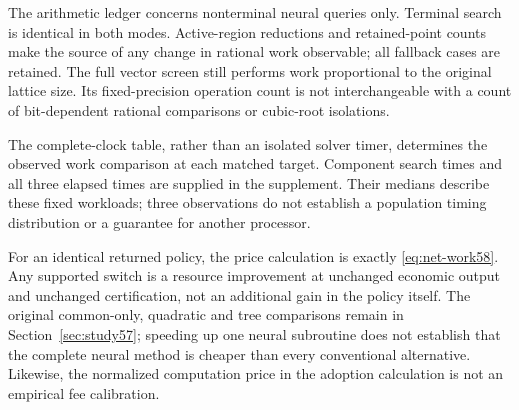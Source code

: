 



The arithmetic ledger concerns nonterminal neural queries only. Terminal search is identical in both modes. Active-region reductions and retained-point counts make the source of any change in rational work observable; all fallback cases are retained. The full vector screen still performs work proportional to the original lattice size. Its fixed-precision operation count is not interchangeable with a count of bit-dependent rational comparisons or cubic-root isolations.

The complete-clock table, rather than an isolated solver timer, determines the observed work comparison at each matched target. Component search times and all three elapsed times are supplied in the supplement. Their medians describe these fixed workloads; three observations do not establish a population timing distribution or a guarantee for another processor.

For an identical returned policy, the price calculation is exactly \eqref{eq:net-work58}. Any supported switch is a resource improvement at unchanged economic output and unchanged certification, not an additional gain in the policy itself. The original common-only, quadratic and tree comparisons remain in Section~\ref{sec:study57}; speeding up one neural subroutine does not establish that the complete neural method is cheaper than every conventional alternative. Likewise, the normalized computation price in the adoption calculation is not an empirical fee calibration.
